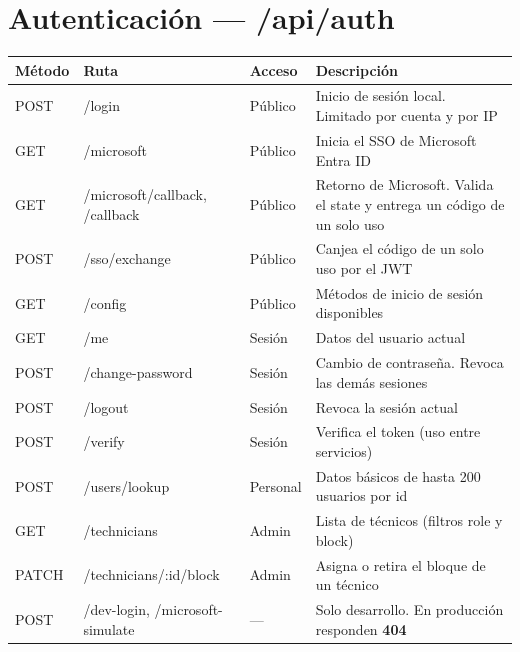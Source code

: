 \documentclass[11pt,a4paper,oneside]{report}
\newcommand{\codus}{\textunderscore\allowbreak}
\DeclareRobustCommand{\cod}[1]{{\small\ttfamily\let\_\codus #1}}
\newcommand{\cabecera}{\rowcolor{utaRojo!12}}
\begin{document}
\section{Autenticación — \cod{/api/auth}}
\begin{longtable}{@{}P{1.7cm}P{5.3cm}P{1.9cm}p{5.6cm}@{}}
\toprule
\cabecera \textbf{Método} & \textbf{Ruta} & \textbf{Acceso} & \textbf{Descripción} \\
\midrule
\endhead
POST & \cod{/login} & Público & Inicio de sesión local. Limitado por cuenta y por IP \\
GET & \cod{/microsoft} & Público & Inicia el SSO de Microsoft Entra ID \\
GET & \cod{/microsoft/callback}, \cod{/callback} & Público & Retorno de Microsoft. Valida el \cod{state} y entrega un código de un solo uso \\
POST & \cod{/sso/exchange} & Público & Canjea el código de un solo uso por el JWT \\
GET & \cod{/config} & Público & Métodos de inicio de sesión disponibles \\
GET & \cod{/me} & Sesión & Datos del usuario actual \\
POST & \cod{/change-password} & Sesión & Cambio de contraseña. Revoca las demás sesiones \\
POST & \cod{/logout} & Sesión & Revoca la sesión actual \\
POST & \cod{/verify} & Sesión & Verifica el token (uso entre servicios) \\
POST & \cod{/users/lookup} & Personal & Datos básicos de hasta 200 usuarios por id \\
GET & \cod{/technicians} & Admin & Lista de técnicos (filtros \cod{role} y \cod{block}) \\
PATCH & \cod{/technicians/:id/block} & Admin & Asigna o retira el bloque de un técnico \\
POST & \cod{/dev-login}, \cod{/microsoft-simulate} & — & Solo desarrollo. En producción responden \textbf{404} \\
\bottomrule
\end{longtable}
\end{document}
